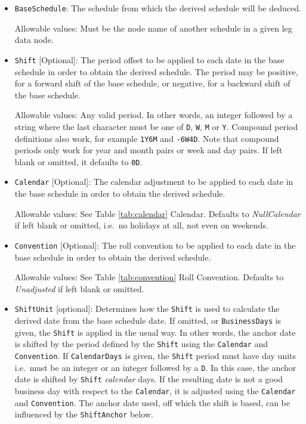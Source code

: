 \begin{itemize}

\item \lstinline!BaseSchedule!: The schedule from which the derived schedule will be deduced.

Allowable values: Must be the node name of another schedule in a given leg data node.

\item \lstinline!Shift! [Optional]:
The period offset to be applied to each date in the base schedule in order to obtain the derived schedule.
The period may be positive, for a forward shift of the base schedule, or negative,
for a backward shift of the base schedule.

Allowable values: Any valid period.
In other words, an integer followed by a string where the last character must be one of 
\lstinline!D!, \lstinline!W!, \lstinline!M! or \lstinline!Y!.
Compound period definitions also work, for example \lstinline!1Y6M! and \lstinline!-6W4D!.
Note that compound periods only work for year and month pairs or week and day pairs.
If left blank or omitted, it defaults to \lstinline!0D!.

\item \lstinline!Calendar! [Optional]: The calendar adjustment to be applied to each date in the base schedule in order to obtain the derived schedule.

Allowable values: See Table \ref{tab:calendar} Calendar. Defaults to \emph{NullCalendar} if left blank or omitted, i.e.\ no holidays at all, not even on weekends.

\item \lstinline!Convention! [Optional]: The roll convention to be applied to each date in the base schedule in order to obtain the derived schedule.

Allowable values: See Table \ref{tab:convention} Roll Convention. Defaults to \emph{Unadjusted} if left blank or omitted.

\item \lstinline!ShiftUnit! [optional]:
Determines how the \lstinline!Shift! is used to calculate the derived date from the base schedule date.
If omitted, or \lstinline!BusinessDays! is given, the \lstinline!Shift! is applied in the usual way.
In other words, the anchor date is shifted by the period defined by the \lstinline!Shift! using the 
\lstinline!Calendar! and \lstinline!Convention!.
If \lstinline!CalendarDays! is given, the \lstinline!Shift! period must have day units i.e.\ must be an integer or an 
integer followed by a \lstinline!D!.
In this case, the anchor date is shifted by \lstinline!Shift! \emph{calendar} days.
If the resulting date is not a good business day with respect to the \lstinline!Calendar!,
it is adjusted using the \lstinline!Calendar! and \lstinline!Convention!.
The anchor date used, off which the shift is based, can be influenced by the \lstinline!ShiftAnchor! below.


\end{itemize}
